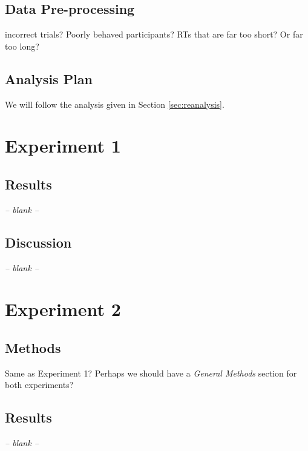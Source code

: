 \documentclass[smallextended]{svjour3}       %
\begin{document}
\subsection{Data Pre-processing}

incorrect trials? Poorly behaved participants? RTs that are far too short? Or far too long?

\subsection{Analysis Plan}

We will follow the analysis given in Section \ref{sec:reanalysis}.


\section{Experiment 1}



\subsection{Results}
\begin{center}
\textit{-- blank --}
\end{center}

\subsection{Discussion}
\begin{center}
\textit{-- blank --}
\end{center}

\section{Experiment 2}

\subsection{Methods}

Same as Experiment 1? Perhaps we should have a \textit{General Methods} section for both experiments?

\subsection{Results}
\begin{center}
\textit{-- blank --}
\end{center}
\end{document}

